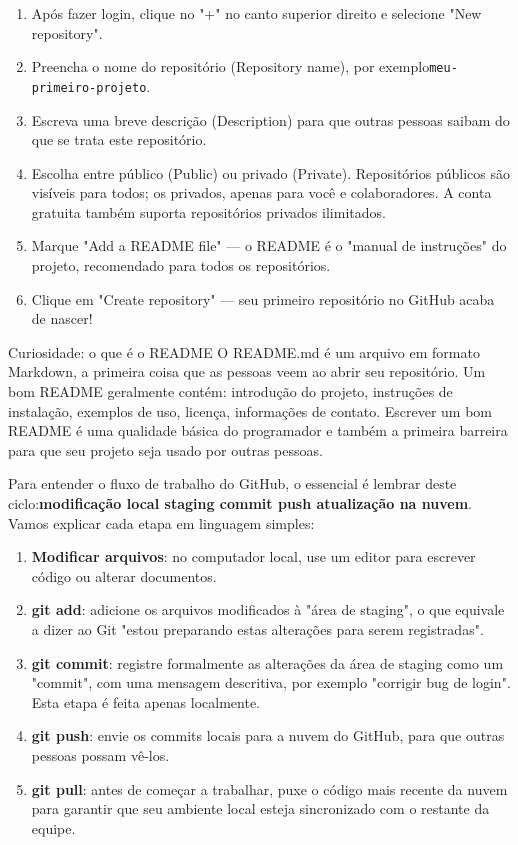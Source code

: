 
\begin{enumerate}
  \item Após fazer login, clique no "+" no canto superior direito e selecione "New repository".
  \item Preencha o nome do repositório (Repository name), por exemplo\texttt{meu-\allowbreak primeiro-\allowbreak projeto}.
  \item Escreva uma breve descrição (Description) para que outras pessoas saibam do que se trata este repositório.
  \item Escolha entre público (Public) ou privado (Private). Repositórios públicos são visíveis para todos; os privados, apenas para você e colaboradores. A conta gratuita também suporta repositórios privados ilimitados.
  \item Marque "Add a README file" — o README é o "manual de instruções" do projeto, recomendado para todos os repositórios.
  \item Clique em "Create repository" — seu primeiro repositório no GitHub acaba de nascer!
\end{enumerate}

\begin{tcbinfo}{Curiosidade: o que é o README}
O README.md é um arquivo em formato Markdown, a primeira coisa que as pessoas veem ao abrir seu repositório. Um bom README geralmente contém: introdução do projeto, instruções de instalação, exemplos de uso, licença, informações de contato. Escrever um bom README é uma qualidade básica do programador e também a primeira barreira para que seu projeto seja usado por outras pessoas.

\end{tcbinfo}


Para entender o fluxo de trabalho do GitHub, o essencial é lembrar deste ciclo:\textbf{modificação local staging commit push atualização na nuvem}. Vamos explicar cada etapa em linguagem simples:

\begin{enumerate}
  \item \textbf{Modificar arquivos}: no computador local, use um editor para escrever código ou alterar documentos.
  \item \textbf{git add}: adicione os arquivos modificados à "área de staging", o que equivale a dizer ao Git "estou preparando estas alterações para serem registradas".
  \item \textbf{git commit}: registre formalmente as alterações da área de staging como um "commit", com uma mensagem descritiva, por exemplo "corrigir bug de login". Esta etapa é feita apenas localmente.
  \item \textbf{git push}: envie os commits locais para a nuvem do GitHub, para que outras pessoas possam vê-los.
  \item \textbf{git pull}: antes de começar a trabalhar, puxe o código mais recente da nuvem para garantir que seu ambiente local esteja sincronizado com o restante da equipe.
\end{enumerate}

